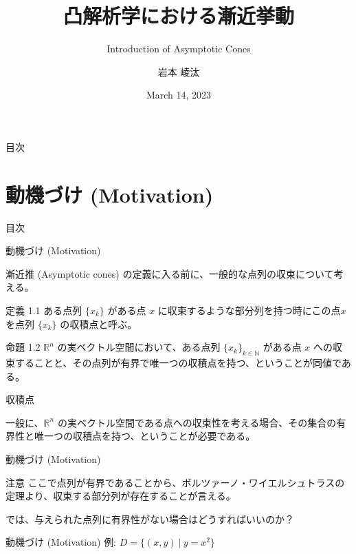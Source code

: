 \documentclass[aspectratio=169, dvipdfmx, 11pt]{beamer} %
\title[凸解析学における漸近挙動]{凸解析学における漸近挙動}
\subtitle{Introduction of Asymptotic Cones}
\author[岩本 崚汰]{岩本 崚汰}
\institute[新潟大学大学院]{新潟大学大学院自然科学研究科}
\date{March 14, 2023}
\begin{document}
\maketitle

\begin{frame}{目次}
    \tableofcontents
\end{frame}

\section{動機づけ (Motivation) }
\begin{frame}{目次}
    \tableofcontents[currentsection]
\end{frame}

\begin{frame}{動機づけ (Motivation) }

  漸近推 (Asymptotic cones) の定義に入る前に、一般的な点列の収束について考える。

  \begin{block}{定義 1.1}
    ある点列 $\{ x_k \}$ がある点 $x$ に収束するような部分列を持つ時にこの点$x$ を点列 $\{ x_k \}$ の収積点と呼ぶ。
  \end{block}

  \begin{block}{命題 1.2}
    $\mathbb{R} ^n$ の実ベクトル空間において、ある点列 $\{ x_k \}_{k \in \mathbb{N}}$ がある点 $x$ への収束することと、その点列が有界で唯一つの収積点を持つ、ということが同値である。

    収積点
  \end{block}

  一般に、$\mathbb{R} ^n$ の実ベクトル空間である点への収束性を考える場合、その集合の有界性と唯一つの収積点を持つ、ということが必要である。
\end{frame}

\begin{frame}{動機づけ (Motivation) }
  \begin{alertblock}{注意}
    ここで点列が有界であることから、ボルツァーノ・ワイエルシュトラスの定理より、収束する部分列が存在することが言える。
  \end{alertblock}

  では、与えられた点列に有界性がない場合はどうすればいいのか？
\end{frame}

\begin{frame}{動機づけ (Motivation) }
  例: $D = \{(x,y) \:|\: y=x^2\}$

\end{frame}
\end{document}
